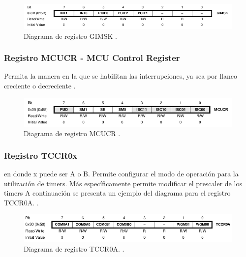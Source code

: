 \begin{figure}[H]
\centering
\includegraphics[scale=0.9]{./images/GIMSK.png} 
\caption{Diagrama de registro GIMSK \cite{datasheet}.}
\label{f1}
\end{figure}

\subsubsection{Registro MCUCR - MCU Control Register}
Permita la manera en la que se habilitan las interrupciones, ya sea por flanco creciente o decreciente \cite{datasheet}.
\begin{figure}[H]
\centering
\includegraphics[scale=0.9]{./images/MCUCR.png} 
\caption{Diagrama de registro MCUCR \cite{datasheet}.}
\label{f1}
\end{figure}

\subsubsection{Registro TCCR0x}
en donde x puede ser A o B.
Permite configurar el modo de operación para la utilización de timers. Más específicamente permite modificar el prescaler de los timers A continuación se presenta un ejemplo del diagrama para el registro TCCR0A.  \cite{datasheet}.
\begin{figure}[H]
\centering
\includegraphics[scale=0.8]{./images/TCCR0A.png} 
\caption{Diagrama de registro TCCR0A. \cite{datasheet}.}
\label{f1}
\end{figure}